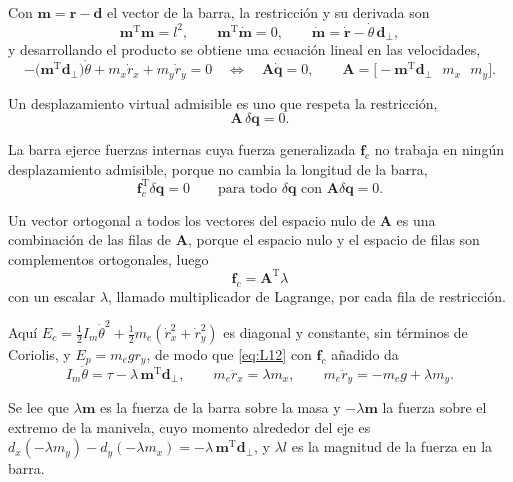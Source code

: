 \documentclass[11pt]{article}
\newcommand{\T}{^{\mathrm{T}}}
\begin{document}
Con $\mathbf{m}=\mathbf{r}-\mathbf{d}$ el vector de la barra, la restricción y su derivada son
\begin{equation}
\mathbf{m}\T\mathbf{m}=l^2,
\qquad
\mathbf{m}\T\dot{\mathbf{m}}=0,
\qquad
\dot{\mathbf{m}}=\dot{\mathbf{r}}-\dot\theta\,\mathbf{d}_{\perp},
\label{eq:R1}
\end{equation}
y desarrollando el producto se obtiene una ecuación lineal en las velocidades,
\begin{equation}
-\big(\mathbf{m}\T\mathbf{d}_{\perp}\big)\dot\theta+m_x\dot r_x+m_y\dot r_y=0
\quad\Longleftrightarrow\quad
\mathbf{A}\dot{\mathbf{q}}=0,
\qquad
\mathbf{A}=\big[-\mathbf{m}\T\mathbf{d}_{\perp}\ \ \ m_x\ \ \ m_y\big].
\label{eq:R2}
\end{equation}

Un desplazamiento virtual admisible es uno que respeta la restricción,
\begin{equation}
\mathbf{A}\,\delta\mathbf{q}=0 .
\label{eq:R3}
\end{equation}

La barra ejerce fuerzas internas cuya fuerza generalizada $\mathbf{f}_c$ no trabaja en ningún desplazamiento admisible, porque no cambia la longitud de la barra,
\begin{equation}
\mathbf{f}_c\T\delta\mathbf{q}=0
\qquad\text{para todo }\delta\mathbf{q}\text{ con }\mathbf{A}\delta\mathbf{q}=0 .
\label{eq:R4}
\end{equation}

Un vector ortogonal a todos los vectores del espacio nulo de $\mathbf{A}$ es una combinación de las filas de $\mathbf{A}$, porque el espacio nulo y el espacio de filas son complementos ortogonales, luego
\begin{equation}
\boxed{\ \mathbf{f}_c=\mathbf{A}\T\lambda\ }
\label{eq:R5}
\end{equation}
con un escalar $\lambda$, llamado multiplicador de Lagrange, por cada fila de restricción.

Aquí $E_c=\tfrac12I_m\dot\theta^2+\tfrac12m_e(\dot r_x^2+\dot r_y^2)$ es diagonal y constante, sin términos de Coriolis, y $E_p=m_egr_y$, de modo que \eqref{eq:L12} con $\mathbf{f}_c$ añadido da
\begin{equation}
I_m\ddot\theta=\tau-\lambda\,\mathbf{m}\T\mathbf{d}_{\perp},
\qquad
m_e\ddot r_x=\lambda m_x,
\qquad
m_e\ddot r_y=-m_eg+\lambda m_y .
\label{eq:R6}
\end{equation}

Se lee que $\lambda\mathbf{m}$ es la fuerza de la barra sobre la masa y $-\lambda\mathbf{m}$ la fuerza sobre el extremo de la manivela, cuyo momento alrededor del eje es $d_x(-\lambda m_y)-d_y(-\lambda m_x)=-\lambda\,\mathbf{m}\T\mathbf{d}_{\perp}$, y $\lambda l$ es la magnitud de la fuerza en la barra.
\end{document}
